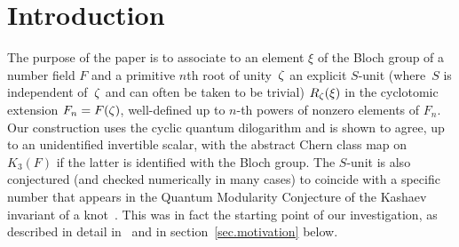 \documentclass[12pt,reqno]{amsart}
\theoremstyle{definition}
\newcommand{\changed}[1]{{#1}}
\def\Q{\mathbf Q}   %
\def\nn{n}
\def\Qbar{\overline{\Q}}
\begin{document}
\begin{abstract}
Given an element of the Bloch group of a number field~$F$ and a natural 
number~$\nn$, we construct an explicit unit in the field    
$F_\nn=F(e^{2 \pi i/\nn})$, well-defined up to $\nn$-th powers of nonzero elements 
of~$F_\nn$.  The construction uses the cyclic quantum dilogarithm, and under 
the identification of the Bloch group of~$F$ with the $K$-group  $K_3(F)$
gives \changed{(up to an unidentified invertible scalar)} 
a \changed{formula} for a certain abstract Chern class from~$K_3(F)$. 
The units we define are conjectured to coincide with numbers appearing in the 
quantum modularity conjecture for the Kashaev invariant of knots (which was 
the original motivation for our investigation), and also appear in 
the radial asymptotics of Nahm sums near roots of unity. This latter 
connection is used to prove Nahm's conjecture relating the 
modularity of certain $q$-hypergeometric series to the vanishing of the
associated elements in the Bloch group of~$\Qbar$.  
\end{abstract}

\maketitle

{\footnotesize
\tableofcontents
}


\section{Introduction}
\label{sec.intro}

The purpose of the paper is to associate to an element $\xi$ of the Bloch 
group of a number field $F$ and a primitive $\nn$th root of unity~$\zeta$ an 
explicit \changed{$S$-unit (where~$S$ is independent of~$\zeta$ and can often 
be taken to be trivial)} $R_\zeta(\xi)$ in the \changed{cyclotomic extension}
$F_\nn=F(\z)$, well-defined up to $\nn$-th powers of nonzero elements of $F_\nn$.
Our construction uses the cyclic quantum dilogarithm and is shown to
\changed{agree, up to an unidentified invertible scalar, with the abstract Chern 
class map on $K_3(F)$ if the latter is identified with the Bloch group.}
The \changed{$S$-unit} is \changed{also} conjectured (and checked numerically
in many cases) 
to coincide with a specific number that appears in the Quantum Modularity
Conjecture of the Kashaev invariant of a knot~\changed{\cite{Za:QMF}}. This was
in fact the starting point of our investigation\changed{, as described
in detail in~\cite{GZ:quantum} and in section~\ref{sec.motivation} below}.  
\end{document}

